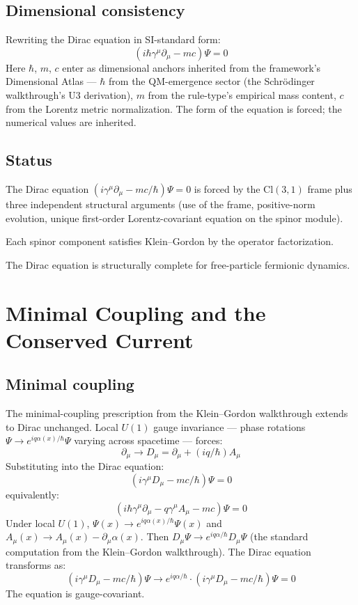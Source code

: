 \documentclass[11pt,a4paper]{article}
\begin{document}
\subsection{Dimensional consistency}

Rewriting the Dirac equation in SI-standard form:
\[
(i\hbar\gamma^\mu\partial_\mu - mc)\Psi = 0
\]
Here $\hbar$, $m$, $c$ enter as dimensional anchors inherited from the framework's Dimensional Atlas --- $\hbar$ from the QM-emergence sector (the Schr\"odinger walkthrough's U3 derivation), $m$ from the rule-type's empirical mass content, $c$ from the Lorentz metric normalization. The form of the equation is forced; the numerical values are inherited.

\subsection{Status}

The Dirac equation $(i\gamma^\mu\partial_\mu - mc/\hbar)\Psi = 0$ is forced by the $\mathrm{Cl}(3,1)$ frame plus three independent structural arguments (use of the frame, positive-norm evolution, unique first-order Lorentz-covariant equation on the spinor module).

Each spinor component satisfies Klein--Gordon by the operator factorization.

The Dirac equation is structurally complete for free-particle fermionic dynamics.

\section{Minimal Coupling and the Conserved Current}

\subsection{Minimal coupling}

The minimal-coupling prescription from the Klein--Gordon walkthrough extends to Dirac unchanged. Local $U(1)$ gauge invariance --- phase rotations $\Psi \to e^{iq\alpha(x)/\hbar}\Psi$ varying across spacetime --- forces:
\[
\partial_\mu \to D_\mu = \partial_\mu + (iq/\hbar)A_\mu
\]
Substituting into the Dirac equation:
\[
(i\gamma^\mu D_\mu - mc/\hbar)\Psi = 0
\]
equivalently:
\[
(i\hbar\gamma^\mu\partial_\mu - q\gamma^\mu A_\mu - mc)\Psi = 0
\]
Under local $U(1)$, $\Psi(x) \to e^{iq\alpha(x)/\hbar}\Psi(x)$ and $A_\mu(x) \to A_\mu(x) - \partial_\mu\alpha(x)$. Then $D_\mu\Psi \to e^{iq\alpha/\hbar}D_\mu\Psi$ (the standard computation from the Klein--Gordon walkthrough). The Dirac equation transforms as:
\[
(i\gamma^\mu D_\mu - mc/\hbar)\Psi \to e^{iq\alpha/\hbar}\cdot(i\gamma^\mu D_\mu - mc/\hbar)\Psi = 0
\]
The equation is gauge-covariant.
\end{document}
